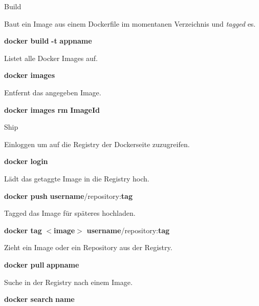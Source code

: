 \documentclass[final]{beamer}
\newlength{\specialcolwid}
\begin{document}
\begin{frame}
\begin{columns}[t]
\begin{column}{\specialcolwid}
\begin{block}{Build}

\par Baut ein Image aus einem Dockerfile im momentanen Verzeichnis und \textit{tagged} es.

\par \textbf{docker build} \textcolor{docker-pu}{\textbf{-t}} \textcolor{docker-lb}{\textbf{appname}}

\vspace{1cm}
\par Listet alle Docker Images auf.
\par \textbf{docker images}

\vspace{1cm}
\par Entfernt das angegeben Image.
\par \textbf{docker images rm} \textcolor{docker-lb}{\textbf{ImageId}}

\end{block}

\begin{block}{Ship}

\par Einloggen um auf die Registry der Dockerseite zuzugreifen.
\par \textbf{docker login}

\vspace{1cm}
\par Lädt das getaggte Image in die Registry hoch.
\par \textbf{docker push} \textcolor{docker-lb}{\textbf{username}}/repository:\textcolor{docker-lb}{\textbf{tag}}

\vspace{1cm}
\par Tagged das Image für späteres hochladen.
\par \textbf{docker tag } $<$\textcolor{docker-lb}{\textbf{image}}$>$ \textcolor{docker-lb}{\textbf{username}}/repository:\textcolor{docker-lb}{\textbf{tag}}

\vspace{1cm}
\par Zieht ein Image oder ein Repository aus der Registry.
\par \textbf{docker pull} \textcolor{docker-lb}{\textbf{appname}}

\vspace{1cm}
\par Suche in der Registry nach einem Image.
\par \textbf{docker search} \textcolor{docker-lb}{\textbf{name}}


\end{block}
\end{column}
\end{columns}
\end{frame}
\end{document}
